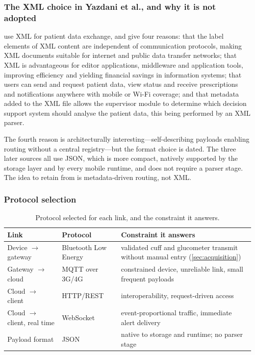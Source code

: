 \documentclass[12pt,a4paper,oneside]{report}
\begin{document}
\subsubsection{The XML choice in Yazdani et al., and why it is not adopted}

\Textcite{yazdani2018} use XML for patient data exchange, and give four reasons: that the label elements of XML content are independent of communication protocols, making XML documents suitable for internet and public data transfer networks; that XML is advantageous for editor applications, middleware and application tools, improving efficiency and yielding financial savings in information systems; that users can send and request patient data, view status and receive prescriptions and notifications anywhere with mobile or Wi-Fi coverage; and that metadata added to the XML file allows the supervisor module to determine which decision support system should analyse the patient data, this being performed by an XML parser.

The fourth reason is architecturally interesting---self-describing payloads enabling routing without a central registry---but the format choice is dated. The three later sources all use JSON, which is more compact, natively supported by the storage layer and by every mobile runtime, and does not require a parser stage. The idea to retain from \textcite{yazdani2018} is metadata-driven routing, not XML.

\subsubsection{Protocol selection}

\begin{table}[htbp]
\centering\small
\caption{Protocol selected for each link, and the constraint it answers.}\label{tab:protocol-selection}
\begin{tabularx}{\textwidth}{@{}>{\raggedright\arraybackslash}p{3.5cm} >{\raggedright\arraybackslash}p{3.2cm} X@{}}
\toprule
\textbf{Link} & \textbf{Protocol} & \textbf{Constraint it answers} \\
\midrule
Device $\rightarrow$ gateway & Bluetooth Low Energy & validated cuff and glucometer transmit without manual entry (\cref{sec:acquisition}) \\
Gateway $\rightarrow$ cloud & MQTT over 3G/4G & constrained device, unreliable link, small frequent payloads \\
Cloud $\rightarrow$ client & HTTP/REST & interoperability, request-driven access \\
Cloud $\rightarrow$ client, real time & WebSocket & event-proportional traffic, immediate alert delivery \\
Payload format & JSON & native to storage and runtime; no parser stage \\
\bottomrule
\end{tabularx}
\end{table}
\end{document}

